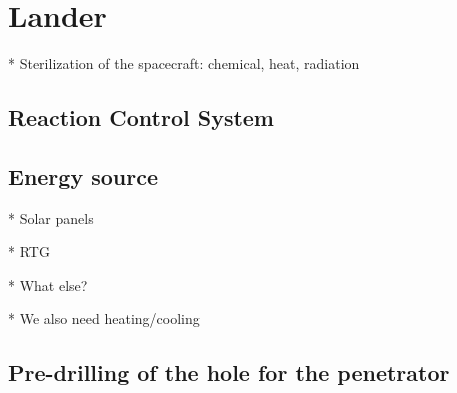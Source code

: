 \chapter{Lander}

* Sterilization of the spacecraft: chemical, heat, radiation




\section{Reaction Control System}






\section{Energy source}

* Solar panels

* RTG

* What else?

* We also need heating/cooling

\section{Pre-drilling of the hole for the penetrator}
